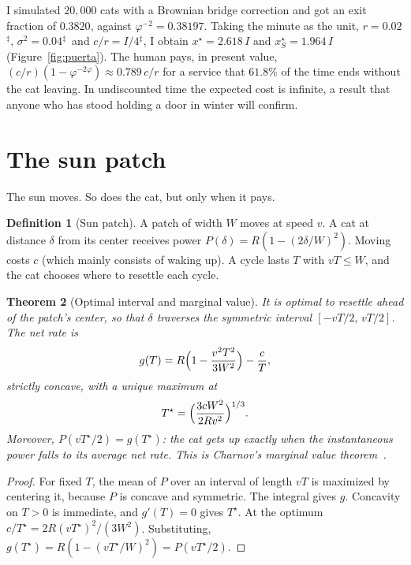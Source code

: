 \documentclass[11pt,a4paper]{article}
\theoremstyle{plain}
\newtheorem{teorema}{Theorem}[section]
\theoremstyle{definition}
\newtheorem{definicion}[teorema]{Definition}
\theoremstyle{remark}
\numberwithin{equation}{section}
\newcommand{\calib}{{\ensuremath{^{\ddagger}}}}
\begin{document}
I simulated $20{,}000$ cats with a Brownian bridge correction and got an exit fraction of $0.3820$, against $\varphi^{-2}=0.38197$. Taking the minute as the unit, $r=0.02$\calib, $\sigma^2=0.04$\calib\ and $c/r=I/4$\calib, I obtain $x^\star=2.618\,I$ and $x_S^\star=1.964\,I$ (Figure~\ref{fig:puerta}). The human pays, in present value, $(c/r)(1-\varphi^{-2\varphi})\approx 0.789\,c/r$ for a service that $61.8\%$ of the time ends without the cat leaving. In undiscounted time the expected cost is infinite, a result that anyone who has stood holding a door in winter will confirm.

\section{The sun patch}\label{sec:sol}

The sun moves. So does the cat, but only when it pays.

\begin{definicion}[Sun patch]
A patch of width $W$ moves at speed $v$. A cat at distance $\delta$ from its center receives power $P(\delta)=R(1-(2\delta/W)^2)$. Moving costs $c$ (which mainly consists of waking up). A cycle lasts $T$ with $vT\le W$, and the cat chooses where to resettle each cycle.
\end{definicion}

\begin{teorema}[Optimal interval and marginal value]\label{teo:sol}
It is optimal to resettle ahead of the patch's center, so that $\delta$ traverses the symmetric interval $[-vT/2,\,vT/2]$. The net rate is
\begin{equation}
  g(T)=R\Bigl(1-\frac{v^2T^2}{3W^2}\Bigr)-\frac{c}{T},
\end{equation}
strictly concave, with a unique maximum at
\begin{equation}
  T^\star=\Bigl(\frac{3cW^2}{2Rv^2}\Bigr)^{1/3}.
\end{equation}
Moreover, $P(vT^\star/2)=g(T^\star)$: the cat gets up exactly when the instantaneous power falls to its average net rate. This is Charnov's marginal value theorem~\cite{charnov}.
\end{teorema}

\begin{proof}
For fixed $T$, the mean of $P$ over an interval of length $vT$ is maximized by centering it, because $P$ is concave and symmetric. The integral gives $g$. Concavity on $T>0$ is immediate, and $g'(T)=0$ gives $T^\star$. At the optimum $c/T^\star=2R(vT^\star)^2/(3W^2)$. Substituting, $g(T^\star)=R(1-(vT^\star/W)^2)=P(vT^\star/2)$.
\end{proof}
\end{document}
